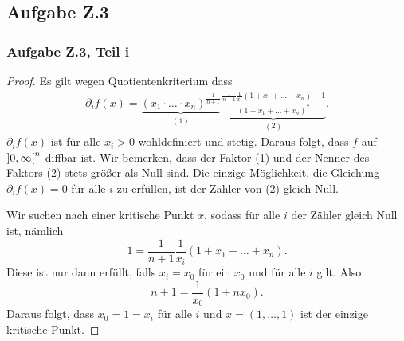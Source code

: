 \documentclass[draft,a5paper]{article}
\theoremstyle{remark}
\newcommand{\interval}[1]{\mathinner{#1}}
\begin{document}
\subsection*{Aufgabe Z.3}
\subsubsection*{Aufgabe Z.3, Teil i}
\begin{proof}
  Es gilt wegen Quotientenkriterium dass
  \begin{align*}
    \partial_{i}f(x) = \underbrace{(x_{1} \cdot \ldots \cdot x_{n})^{\frac{1}{n+1}}}_{(1)}
    \underbrace{\frac{\frac{1}{n+1}\frac{1}{x_{i}}(1+x_{1}+\ldots+x_{n}) - 1}{(1+x_{1}+\ldots+x_{n})^{2}}}_{(2)}.
  \end{align*}
  \(\partial_{i}f(x)\) ist für alle \(x_{i} > 0\) wohldefiniert und stetig.
  Daraus folgt, dass \(f\) auf \(\interval{]0, \infty[}^{n}\) diffbar ist.
  Wir bemerken, dass der Faktor (1) und der Nenner des Faktors (2)
  stets größer als Null sind.  Die einzige Möglichkeit, die Gleichung
  \(\partial_{i}f(x) = 0\) für alle \(i\) zu erfüllen, ist der Zähler von (2)
  gleich Null.

  Wir suchen nach einer kritische Punkt \(x\), sodass für alle \(i\)
  der Zähler gleich Null ist, nämlich
  \[ 1 = \frac{1}{n+1}\frac{1}{x_{i}}(1+x_{1}+\ldots+x_{n}). \]
  Diese ist nur dann erfüllt, falls \(x_{i} = x_{0}\) für ein
  \(x_{0}\) und für alle \(i\) gilt.  Also
  \[n + 1 = \frac{1}{x_{0}}(1+nx_{0}).\]
  Daraus folgt, dass \(x_{0} = 1 = x_{i}\) für alle \(i\) und \(x =
  (1, \ldots, 1)\) ist der einzige kritische Punkt.
\end{proof}
\end{document}
